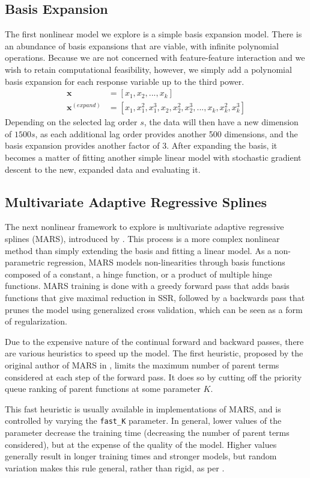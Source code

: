 \documentclass[master]{subfiles}
\begin{document}
\subsection{Basis Expansion}
The first nonlinear model we explore is a simple basis expansion model.  There is an abundance of basis expansions that are viable, with infinite polynomial operations.  Because we are not concerned with feature-feature interaction and we wish to retain computational feasibility, however, we simply add a polynomial basis expansion for each response variable up to the third power.
\begin{align*}
\mathbf{x} &= [x_1, x_2, ..., x_k]\\
\mathbf{x}^{(expand)} &= [x_1, x_1^2, x_1^3, x_2, x_2^2, x_2^3, ..., x_k, x_k^2, x_k^3]
\end{align*}
Depending on the selected lag order $s$, the data will then have a new dimension of $1500s$, as each additional lag order provides another 500 dimensions, and the basis expansion provides another factor of 3.  After expanding the basis, it becomes a matter of fitting another simple linear model with stochastic gradient descent to the new, expanded data and evaluating it.\par
\subsection{Multivariate Adaptive Regressive Splines}
The next nonlinear framework to explore is multivariate adaptive regressive splines (MARS), introduced by \cite{mars}.  This process is a more complex nonlinear method than simply extending the basis and fitting a linear model.  As a non-parametric regression, MARS models non-linearities through basis functions composed of a constant, a hinge function, or a product of multiple hinge functions.  MARS training is done with a greedy forward pass that adds basis functions that give maximal reduction in SSR, followed by a backwards pass that prunes the model using generalized cross validation, which can be seen as a form of regularization.\par
Due to the expensive nature of the continual forward and backward passes, there are various heuristics to speed up the model.  The first heuristic, proposed by the original author of MARS in \cite{fastmars}, limits the maximum number of parent terms considered at each step of the forward pass.  It does so by cutting off the priority queue ranking of parent functions at some parameter $K$.\par
This fast heuristic is usually available in implementations of MARS, and is controlled by varying the \lstinline{fast_K} parameter.  In general, lower values of the parameter decrease the training time (decreasing the number of parent terms considered), but at the expense of the quality of the model.  Higher values generally result in longer training times and stronger models, but random variation makes this rule general, rather than rigid, as per \cite{earth}.\par
\end{document}
